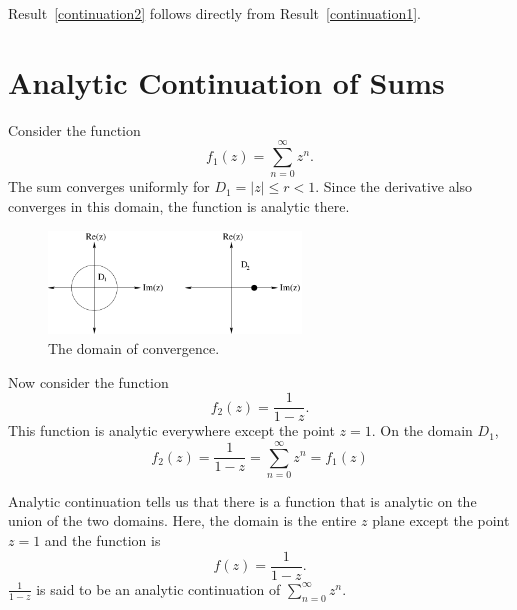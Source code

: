 Result~\ref{continuation2} follows directly from Result~\ref{continuation1}.




\section{Analytic Continuation of Sums}



\begin{Example}
  Consider the function
  \[
  f_1(z) = \sum_{n = 0}^\infty z^n.
  \]
  The sum converges uniformly for $D_1 = |z| \leq r < 1$.
  Since the derivative also
  converges in this domain, the function is analytic there.

  \begin{figure}[htb!]
    \begin{center}
      \includegraphics[width=0.6\textwidth]{fcv/continuation/ooomz}
    \end{center}
    \caption{The domain of convergence.}
    \label{ooomz}
  \end{figure}

  Now consider the function
  \[
  f_2(z) =  \frac{1}{1-z}.
  \]
  This function is analytic everywhere except the point $z = 1$.  On the
  domain $D_1$,
  \[
  f_2(z) = \frac{1}{1-z} = \sum_{n = 0}^\infty z^n = f_1(z)
  \]

  Analytic continuation tells us that there is a function that is analytic
  on the union of the two domains.  Here, the domain is the entire $z$ plane
  except the point $z = 1$ and the function is
  \[ f(z) = \frac{1}{1-z}. \]
  $\frac{1}{1-z}$ is said to be an analytic continuation of
  $\sum_{n = 0}^\infty z^n$.
\end{Example}










